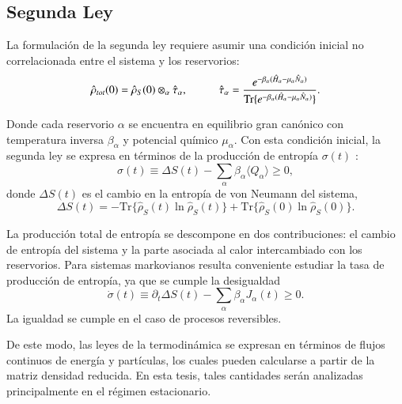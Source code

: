 \subsection{Segunda Ley}
La formulación de la segunda ley requiere asumir una condición inicial no correlacionada entre el sistema y los reservorios:
\begin{equation*}
    \hat{\rho}_{tot}(0) = \hat{\rho}_{S}(0)\otimes_{\alpha}\hat{\tau}_{\alpha}, 
    \hspace{10mm}  
    \hat{\tau}_{\alpha} = \frac{e^{-\beta_{\alpha}(\hat{H}_{\alpha}-\mu_{\alpha}\hat{N}_{\alpha}) }}
    {\text{Tr}\{e^{-\beta_{\alpha}(\hat{H}_{\alpha} - \mu_{\alpha}\hat{N}_{\alpha})}\} }.
\end{equation*}

Donde cada reservorio $\alpha$ se encuentra en equilibrio gran canónico con temperatura inversa $\beta_{\alpha}$ y potencial químico $\mu_{\alpha}$. Con esta condición inicial, la segunda ley se expresa en términos de la producción de entropía $\sigma(t)$ \cite{esposito2010entropy}:
\begin{equation*}
    \sigma(t) \equiv \Delta S(t) - \sum_{\alpha}\beta_{\alpha}\langle Q_{\alpha}\rangle \geq 0,
\end{equation*}
donde $\Delta S(t)$ es el cambio en la entropía de von Neumann del sistema,
\begin{equation*}
    \Delta S(t) = -  \text{Tr}\{\hat{\rho}_{S}(t)\ln \hat{\rho}_{S}(t) \} 
    +  \text{Tr}\{ \hat{\rho}_{S}(0)\ln \hat{\rho}_{S}(0) \}.
\end{equation*}

La producción total de entropía se descompone en dos contribuciones: el cambio de entropía del sistema y la parte asociada al calor intercambiado con los reservorios. Para sistemas markovianos resulta conveniente estudiar la tasa de producción de entropía, ya que se cumple la desigualdad \cite{strasberg2019non}
\begin{equation*}
    \dot{\sigma}(t) \equiv \partial_{t}\Delta S(t) - \sum_{\alpha}\beta_{\alpha}J_{\alpha}(t) \geq 0.
\end{equation*}
La igualdad se cumple en el caso de procesos reversibles.  

De este modo, las leyes de la termodinámica se expresan en términos de flujos continuos de energía y partículas, los cuales pueden calcularse a partir de la matriz densidad reducida. En esta tesis, tales cantidades serán analizadas principalmente en el régimen estacionario.
\label{sec3sub:leyestermo}



